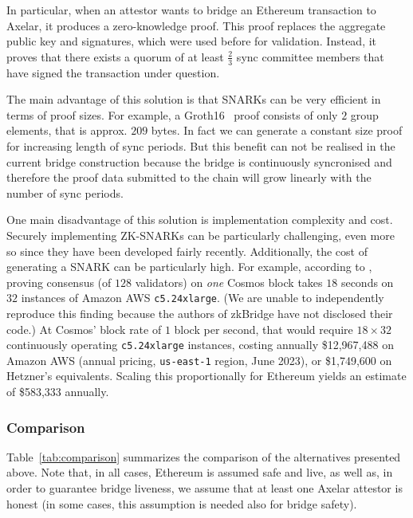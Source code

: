 In particular, when an attestor wants to bridge an Ethereum transaction to
Axelar, it produces a zero-knowledge proof. This proof replaces the aggregate
public key and signatures, which were used before for validation. Instead, it
proves that there exists a quorum of at least $\frac{2}{3}$ sync committee
members that have signed the transaction under question.

The main advantage of this solution is that SNARKs can be very efficient in
terms of proof sizes. For example, a Groth16~\cite{EC:Groth16} proof consists
of only $2$ group elements, that is approx. $209$ bytes. In fact we can generate a constant
size proof for increasing length of sync periods. But this benefit
can not be realised in the current bridge construction because the bridge is
continuously syncronised and therefore the proof data submitted to the chain
will grow linearly with the number of sync periods.

One main disadvantage of this solution is implementation complexity and cost.
Securely implementing ZK-SNARKs can be particularly challenging, even more so
since they have been developed fairly recently. Additionally, the cost of
generating a SNARK can be particularly high. For example,
according to \cite{zkbridge}, proving consensus (of $128$ validators)
on \emph{one} Cosmos block
takes $18$ seconds on $32$ instances of Amazon AWS \texttt{c5.24xlarge}.
(We are unable to independently reproduce this finding because the authors of
zkBridge have not disclosed their code.)
At Cosmos' block rate of $1$ block per second,
that would require
$18 \times 32$ continuously operating \texttt{c5.24xlarge} instances,
costing annually
\$12,967,488 on Amazon AWS (annual pricing, \texttt{us-east-1} region, June 2023),
or \$1,749,600 on Hetzner's equivalents.
Scaling this proportionally for Ethereum
yields an estimate of \$583,333 annually.

\subsubsection{Comparison}

Table~\ref{tab:comparison} summarizes the comparison of the alternatives
presented above. Note that, in all cases, Ethereum is assumed safe and live, as
well as, in order to guarantee bridge liveness, we assume that at least one
Axelar attestor is honest (in some cases, this assumption is needed also for
bridge safety).

